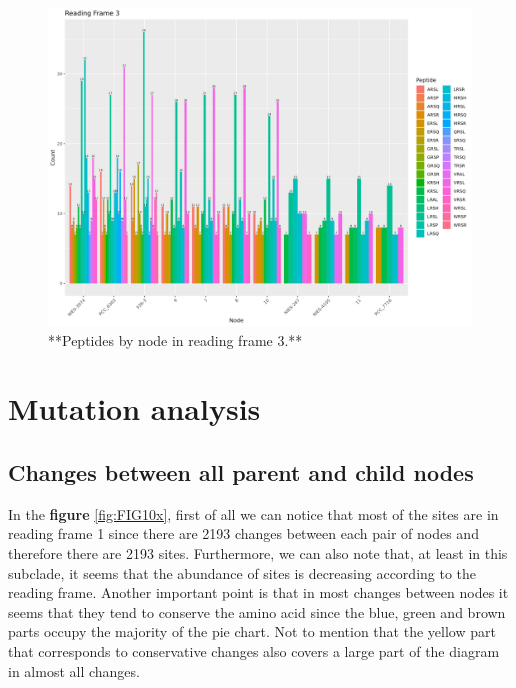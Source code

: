 \documentclass[
]{book}
\begin{document}
\begin{figure}
\includegraphics[width=1\linewidth]{figures/Peptides_RF3} \caption{**Peptides by node in reading frame 3.**}\label{fig:FIG9x}
\end{figure}

\hypertarget{mutation-analysis-1}{%
\section{Mutation analysis}\label{mutation-analysis-1}}

\hypertarget{changes-between-all-parent-and-child-nodes}{%
\subsection{Changes between all parent and child nodes}\label{changes-between-all-parent-and-child-nodes}}

In the \textbf{figure} \ref{fig:FIG10x}, first of all we can notice that most of the sites are in reading frame 1 since there are 2193 changes between each pair of nodes and therefore there are 2193 sites. Furthermore, we can also note that, at least in this subclade, it seems that the abundance of sites is decreasing according to the reading frame. Another important point is that in most changes between nodes it seems that they tend to conserve the amino acid since the blue, green and brown parts occupy the majority of the pie chart. Not to mention that the yellow part that corresponds to conservative changes also covers a large part of the diagram in almost all changes.
\end{document}
